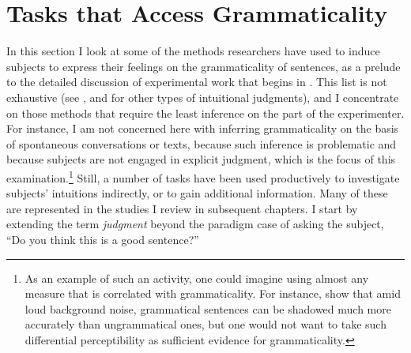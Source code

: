 \section{Tasks that Access Grammaticality}\label{sec:3.2}

In this section I look at some of the methods researchers have used to induce subjects to express their feelings on the grammaticality of sentences, as a prelude to the detailed discussion of experimental work that begins in . This list is not exhaustive (see \citet[106]{Labov1972b}, and \citet{BialystokEtAl1985} for other types of intuitional judgments), and I concentrate on those methods that require the least inference on the part of the experimenter. For instance, I am not concerned here with inferring grammaticality on the basis of spontaneous conversations or texts, because such inference is problematic and because subjects are not engaged in explicit judgment, which is the focus of this examination.\footnote{As an example of such an activity, one could imagine using almost any measure that is correlated with grammaticality. For instance, \citet{Miller1963}
show that amid loud background noise, grammatical sentences can be shadowed much more accurately than ungrammatical ones, but one would not want to take such differential perceptibility as sufficient evidence for grammaticality.
}
Still, a number of tasks have been used productively to investigate subjects' intuitions indirectly, or to gain additional information. Many of these are represented in the studies I review in subsequent chapters. I start by extending the term \textit{judgment} beyond the paradigm case of asking the subject, ``Do you think this is a good sentence?''

